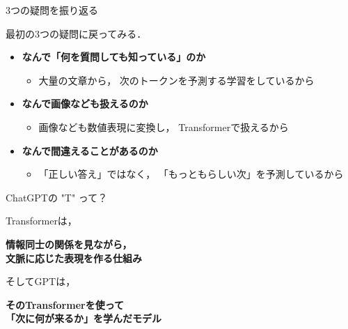 \documentclass[aspectratio=169,professionalfonts]{beamer}
\begin{document}
\begin{frame}{3つの疑問を振り返る}

  最初の3つの疑問に戻ってみる．

  \vspace{1em}

  \begin{itemize}
    \item \textbf{なんで「何を質問しても知っている」のか}
      \begin{itemize}
        \item 大量の文章から，
              次のトークンを予測する学習をしているから
      \end{itemize}

    \item \textbf{なんで画像なども扱えるのか}
      \begin{itemize}
        \item 画像なども数値表現に変換し，
              Transformerで扱えるから
      \end{itemize}

    \item \textbf{なんで間違えることがあるのか}
      \begin{itemize}
        \item 「正しい答え」ではなく，
              「もっともらしい次」を予測しているから
      \end{itemize}
  \end{itemize}


\end{frame}


\begin{frame}{ChatGPTの "T" って？}

  \begin{center}

    \Large
    Transformerは，

    \vspace{1em}

    \textbf{情報同士の関係を見ながら，\\
    文脈に応じた表現を作る仕組み}

    \vspace{1.5em}

    \normalsize
    そしてGPTは，

    \vspace{0.5em}

    \textbf{そのTransformerを使って\\
    「次に何が来るか」を学んだモデル}

  \end{center}

\end{frame}
\end{document}
